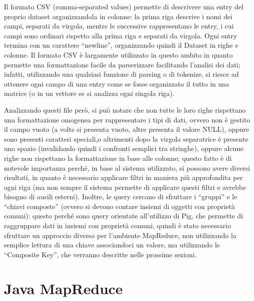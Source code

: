 \documentclass[11pt]{report} %
\begin{document}
Il formato CSV (comma-separated values) permette di descrivere una entry del proprio dataset organizzandola in colonne: la prima riga descrive i nomi dei campi, separati da virgola, mentre le successive rappresentano le entry, i cui campi sono ordinari rispetto alla prima riga e separati da virgola. Ogni entry termina con un carattere ``newline'', organizzando quindi il Dataset in righe e colonne. Il formato CSV è largamente utilizzato in questo ambito in quanto permette una formattazione facile da parserizzare facilitando l'analisi dei dati; infatti, utilizzando una qualsiasi funzione di parsing o di tokenize, si riesce ad ottenere ogni campo di una entry come se fosse organizzato il tutto in una matrice (o in un vettore se si analizza ogni singola riga).

Analizzando questi file però, si può notare che non tutte le loro righe rispettano una formattazione omogenea per rappresentare i tipi di dati, ovvero non è gestito il campo vuoto (a volte si presenta vuoto, altre presenta il valore NULL), oppure sono presenti caratteri speciali,o altrimenti dopo la virgola separatrice è presente uno spazio (invalidando quindi i confronti semplici tra stringhe), oppure alcune righe non rispettano la formattazione in base alle colonne; questo fatto è di notevole importanza perché, in base al sistema utilizzato, si possono avere diversi risultati, in quanto è necessario applicare filtri in maniera più approfondita per ogni riga (ma non sempre il sistema permette di applicare questi filtri e avrebbe bisogno di ausili esterni). Inoltre, le query cercano di sfruttare i ``gruppi'' e le ``chiavi composte'' (ovvero si devono contare insiemi di oggetti con proprietà comuni): questo perché sono query orientate all'utilizzo di Pig, che permette di raggruppare dati in insiemi con proprietà comuni, quindi è stato necessario sfruttare un approccio diverso per l'ambiente MapReduce, non utilizzando la semplice lettura di una chiave associandoci un valore, ma utilizzando le ``Composite Key'', che verranno descritte nelle prossime sezioni.

\section{Java MapReduce}
\end{document}
